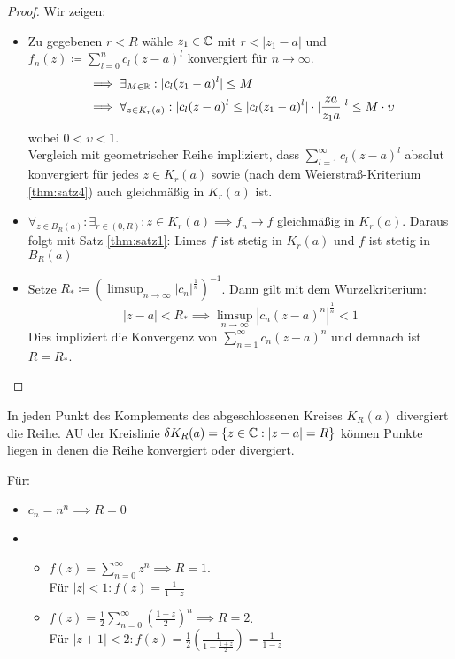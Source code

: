 \begin{proof}
	Wir zeigen:
\begin{itemize}
	\item Zu gegebenen $r<R$ wähle $z_1 \in \mathbb{C}$ mit $r < |z_1-a|$ und $f_n(z)\coloneqq \sum_{l=0}^{n}c_l(z-a)^{l}$ konvergiert für $n \to \infty$.
		\begin{align*}
		&\implies \exists_{M \in \mathbb{R}}: | c_l (z_1-a)^{l}|\le M \\
		&\implies \forall_{z \in K_r(a)}: | c_l(z-a)^{l}\le |c_l(z_1-a)^{l}|\cdot |\frac{za}{z_1a}|^{l} \le  M \cdot \upsilon 
		\end{align*}
		wobei $0< \upsilon <1$. \\
		Vergleich mit geometrischer Reihe impliziert, dass $\sum_{l=1}^{\infty}c_l(z-a)^{l}$ absolut konvergiert für jedes $z \in K_r(a)$ sowie (nach dem Weierstraß-Kriterium \ref{thm:satz4}) auch gleichmäßig in $K_r(a)$ ist.
	\item $\forall_{z \in B_R(a)}:\exists_{r \in (0,R)}: z \in K_r(a) \implies f_n \to f  $ gleichmäßig in $K_r(a)$. Daraus folgt mit Satz \ref{thm:satz1}: Limes $f$ ist stetig in $K_r(a)$ und $f$ ist stetig in $B_R(a)$
	\item Setze $R_* \coloneqq (\limsup_{n \to \infty} |c_n|^{\frac{1}{n}})^{-1}$. Dann gilt mit dem Wurzelkriterium:
		\[
		|z-a| < R_* \implies \limsup_{n \to \infty} |c_n(z-a)^n|^{\frac{1}{n}}<1
		\]
		Dies impliziert die Konvergenz von $\sum_{n=1}^{\infty}c_n(z-a)^{n}$ und demnach ist $R=R_*$.  
\end{itemize}
\end{proof}
\begin{remark}
In jeden Punkt des Komplements des abgeschlossenen Kreises $K_R(a)$ divergiert die Reihe. AU der Kreislinie $\delta K_R(a) = \{z \in \mathbb{C} :| z-a|=R\} $ können Punkte liegen in denen die Reihe konvergiert oder divergiert. 
\end{remark}
\begin{example}
Für:
\begin{itemize}
	\item $c_n=n^{n} \implies R=0$
	\item
		\begin{itemize}
			\item $f(z) = \sum_{n=0}^{\infty}z^{n} \implies R=1$. \\Für $|z|<1:f(z)=\frac{1}{1-z}$
			\item $f(z)= \frac{1}{2}\sum_{n=0}^{\infty}\left( \frac{1+z}{2} \right)^n \implies R=2$. \\
				Für $|z+1| <2 : f(z)= \frac{1}{2}\left( \frac{1}{1-\frac{1+z}{2}} \right)= \frac{1}{1-z}$ 
		\end{itemize}
\end{itemize}
\end{example}
